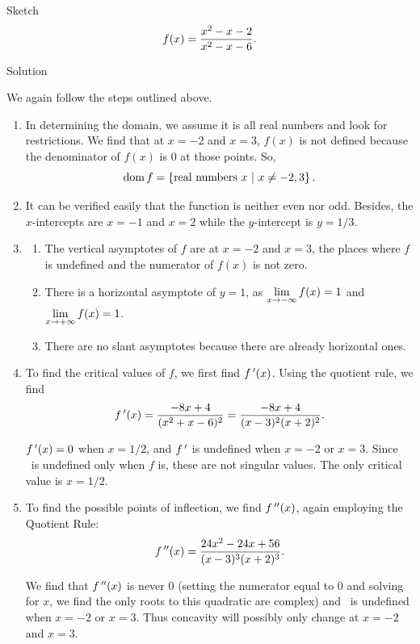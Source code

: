 \begin{example}\label{ex_sketch2}
Sketch 
$$\displaystyle f(x) = \frac{x^2-x-2}{x^2-x-6}.$$

Solution 

We again follow the steps outlined above.

\begin{enumerate}
		\item	In determining the domain, we assume it is all real numbers and look for restrictions. We find that at $x=-2$ and $x=3$, $f(x)$ is not defined because the denominator of $f(x)$ is 0 at those points. So, 
		$$\text{dom}{\,}f = \{\text{real numbers } x\ | \ x\neq -2,3\}\,.$$
\item It can be verified easily that the function is neither even nor odd. Besides, the $x$-intercepts are $x=-1$ and $x=2$ while the $y$-intercept is $y=1/3$.

\item \begin{enumerate}
\item			The vertical asymptotes of $f$ are at $x=-2$ and $x=3$, the places where $f$ is undefined and the numerator of $f(x)$ is not zero.
		
		\item		There is a horizontal asymptote of $y=1$, as $\displaystyle \lim_{x\to -\infty}f(x) = 1$ and $\displaystyle\lim_{x\to+\infty}f(x) =1$.
		\item There are no slant asymptotes because there are already horizontal ones. 
\end{enumerate}
		\item		To find the critical values of $f$, we first find $f\,'(x)$. Using the quotient rule, we find $$f\,'(x) = \frac{-8x+4}{(x^2+x-6)^2} = \frac{-8x+4}{(x-3)^2(x+2)^2}.$$
		
		$f\,'(x) = 0$ when $x = 1/2$, and $f\,'$ is undefined when $x=-2$ or $x=3$. Since \fp\ is undefined only when $f$ is, these are not singular values. The only critical value is $x=1/2$.
		
		\item		To find the possible points of inflection, we find $f\,''(x)$, again employing the Quotient Rule: $$f\,''(x) = \frac{24x^2-24x+56}{(x-3)^3(x+2)^3}.$$
		
		We find that $f\,''(x)$ is never 0 (setting the numerator equal to 0 and solving for $x$, we find the only roots to this quadratic are complex) and \fpp\ is undefined when $x=-2$ or $x=3$. Thus concavity will possibly only change at $x=-2$ and $x=3$.
		


\end{enumerate}
\end{example}
